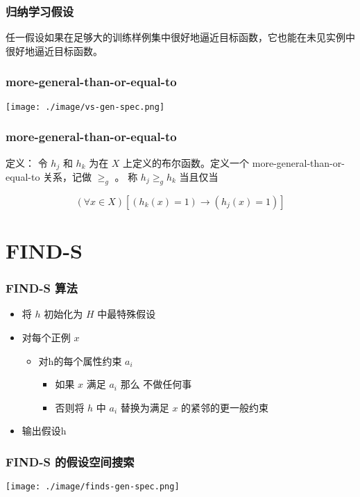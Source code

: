 \documentclass{beamer}
\begin{document}
\begin{frame}
\frametitle{归纳学习假设}
\label{sec-1-5}


任一假设如果在足够大的训练样例集中很好地逼近目标函数，它也能在未见实例中很好地逼近目标函数。
\end{frame}
\begin{frame}
\frametitle{more-general-than-or-equal-to}
\label{sec-1-6}


\center
\texttt{[image: ./image/vs-gen-spec.png]}
\end{frame}
\begin{frame}
\frametitle{more-general-than-or-equal-to}
\label{sec-1-7}


定义： 令 $h_j$ 和 $h_k$ 为在 $X$ 上定义的布尔函数。定义一个 more-general-than-or-equal-to 关系，记做 $\geq_g$ 。 称 $h_j \geq_g h_k$ 当且仅当

$$(\forall x\in X)[(h_k(x)=1)\rightarrow (h_j(x)=1)]$$
\end{frame}
\section{FIND-S}
\label{sec-2}
\begin{frame}
\frametitle{FIND-S 算法}
\label{sec-2-1}


\begin{itemize}
\item 将 $h$ 初始化为 $H$ 中最特殊假设
\item 对每个正例 $x$
\begin{itemize}
\item 对h的每个属性约束 $a_i$
\begin{itemize}
\item 如果 $x$ 满足 $a_i$
        那么 不做任何事
\item 否则将 $h$ 中 $a_i$ 替换为满足 $x$ 的紧邻的更一般约束
\end{itemize}
\end{itemize}
\item 输出假设h
\end{itemize}
\end{frame}
\begin{frame}
\frametitle{FIND-S 的假设空间搜索}
\label{sec-2-2}

\center
\texttt{[image: ./image/finds-gen-spec.png]}
\end{frame}
\end{document}
